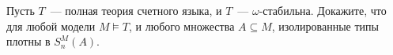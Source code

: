Пусть $T$~--- полная теория счетного языка, и $T$~--- $\omega$-стабильна. Докажите, что для любой модели
$M \models T$, и любого множества $A \subseteq M$, изолированные типы плотны в $S_n^M(A)$.
